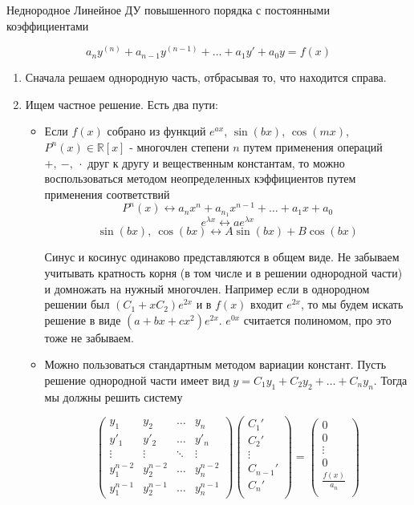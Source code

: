 \documentclass[11pt]{article}
\begin{document}
	\begin{center}
		Неднородное Линейное ДУ повышенного порядка с постоянными коэффициентами
	\end{center}
	$$a_{n} y^{(n)} +a_{n-1} y^{(n-1)} + \dots + a_{1} y' + a_{0} y = f(x) $$
	\begin{enumerate}
		\item Сначала решаем однородную часть, отбрасывая то, что находится справа.
		\item Ищем частное решение. Есть два пути:
			\begin{itemize}
				\item Если $f(x)$ собрано из функций $e^{ax}$, $\sin(bx)$, $\cos(mx)$, $P^n (x) \in \mathbb{R}[x]$ - многочлен степени $n$ путем применения операций $+,\ -,\ \cdot$ друг к другу и вещественным константам, то можно воспользоваться методом неопределенных кэффициентов путем применения соответствий
				$$P^n (x) \leftrightarrow a_n x^n + a_{n_1} x^{n-1} + \dots + a_1 x + a_0$$
				$$e^{\lambda x} \leftrightarrow ae^{\lambda x}$$
				$$\sin(bx),\ \cos (bx) \leftrightarrow A\sin(bx) + B\cos(bx)$$
				
				Синус и косинус одинаково представляются в общем виде. Не забываем учитывать кратность корня (в том числе и в решении однородной части) и домножать на нужный многочлен. Например если в однородном решении был $(C_1 + xC_2)e^{2x}$ и в $f(x)$ входит $e^{2x}$, то мы будем искать решение в виде $(a + bx + cx^2)e^{2x}$. $e^{0x}$ считается полиномом, про это тоже не забываем.
				\item Можно пользоваться стандартным методом вариации констант. Пусть решение однородной части имеет вид $y = C_1 y_1 +C_2 y_2 +\dots + C_n y_n$. Тогда мы должны решить систему
				
				$$\begin{pmatrix}
				y_1 & y_2 & \dots & y_n\\
				y'_1 & y'_2 & \dots & y'_n\\
				\vdots & \vdots & \ddots & \vdots\\
				y_1^{n-2} & y_2^{n-2} & \dots & y_n^{n-2}\\
				y_1^{n-1} & y_2^{n-1} & \dots & y_n^{n-1}
				\end{pmatrix}
				\begin{pmatrix}
				C_1'\\
				C_2'\\
				\vdots\\
				C_{n-1}'\\
				C_n'\\
				\end{pmatrix}=
				\begin{pmatrix}
				0\\
				0\\
				\vdots\\
				0\\
				\frac{f(x)}{a_n}\\
				\end{pmatrix}
				$$
				

\end{itemize}
\end{enumerate}
\end{document}
